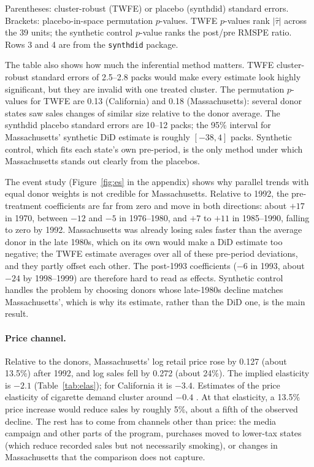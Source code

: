 \documentclass[11pt]{article}
\begin{document}
\begin{table}[H]\centering\small
\caption{Average effect on per-capita cigarette sales (packs) in the post-treatment period.}\label{tab:main}

\par\smallskip\footnotesize Parentheses: cluster-robust (TWFE) or placebo (synthdid)
standard errors. Brackets: placebo-in-space permutation $p$-values. TWFE
$p$-values rank $|\hat\tau|$ across the 39 units; the synthetic control $p$-value
ranks the post/pre RMSPE ratio. Rows 3 and 4 are from the \texttt{synthdid}
package.
\end{table}

The table also shows how much the inferential method matters. TWFE
cluster-robust standard errors of 2.5--2.8 packs would make every estimate look
highly significant, but they are invalid with one treated cluster. The
permutation $p$-values for TWFE are 0.13 (California) and 0.18
(Massachusetts): several donor states saw sales changes of similar size relative
to the donor average. The synthdid placebo standard errors are 10--12 packs;
the 95\% interval for Massachusetts' synthetic DiD estimate is roughly
$[-38, 4]$ packs. Synthetic control, which fits each state's own pre-period,
is the only method under which Massachusetts stands out clearly from the
placebos.

The event study (Figure~\ref{fig:es} in the appendix) shows why parallel
trends with equal donor weights is not credible for Massachusetts. Relative to
1992, the pre-treatment coefficients are far from zero and move in both
directions: about $+17$ in 1970, between $-12$ and $-5$ in 1976--1980, and $+7$
to $+11$ in 1985--1990, falling to zero by 1992. Massachusetts was already
losing sales faster than the average donor in the late 1980s, which on its own
would make a DiD estimate too negative; the TWFE estimate averages over all of
these pre-period deviations, and they partly offset each other. The post-1993
coefficients ($-6$ in 1993, about $-24$ by 1998--1999) are therefore hard to
read as effects. Synthetic control handles the problem by choosing donors
whose late-1980s decline matches Massachusetts', which is why its estimate,
rather than the DiD one, is the main result.

\paragraph{Price channel.}
Relative to the donors, Massachusetts' log retail price rose by 0.127 (about
13.5\%) after 1992, and log sales fell by 0.272 (about 24\%). The implied
elasticity is $-2.1$ (Table~\ref{tab:elas}); for California it is $-3.4$.
Estimates of the price elasticity of cigarette demand cluster around $-0.4$
\citep{chaloupka2000}. At that elasticity, a 13.5\% price increase would
reduce sales by roughly 5\%, about a fifth of the observed decline. The rest has
to come from channels other than price: the media campaign and other parts of
the program, purchases moved to lower-tax states (which reduce recorded sales
but not necessarily smoking), or changes in Massachusetts that the comparison
does not capture.
\end{document}
